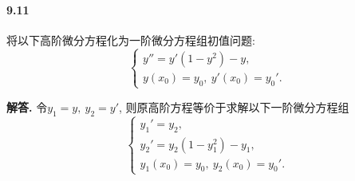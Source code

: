 \documentclass[12pt, a4paper, oneside]{ctexart}
\newenvironment{solution}{\par\noindent\textbf{解答. }}{\bigskip\par}
\begin{document}
\paragraph{9.11}将以下高阶微分方程化为一阶微分方程组初值问题:
\begin{equation*}
    \begin{cases}
        y'' = y'(1-y^2)-y,\\
        y(x_0)=y_0,\ y'(x_0)=y_0'.
    \end{cases}
\end{equation*}
\begin{solution}
    令$y_1 = y,\ y_2 = y'$, 则原高阶方程等价于求解以下一阶微分方程组
    \begin{equation*}
        \begin{cases}
            y_1' = y_2,\\
            y_2' = y_2(1-y_1^2) - y_1,\\
            y_1(x_0) = y_0,\ y_2(x_0) = y_0'.
        \end{cases}
    \end{equation*}
\end{solution}
\iffalse
\centerline{
    \texttt{[image: figure.png]}
}
\fi
\iffalse
\renewcommand\arraystretch{0.8} %
\begin{table}[!htbp] %
    \centering %
    \begin{tabular}{p{1cm}<{\centering}p{1cm}<{\centering}p{3cm}<{\centering}p{5cm}<{\centering}} %
        \toprule
        $x_i$ & $f[x_1]$ & $f[x_i,x_{i+1}]$ & $f[x_i,x_{i+1},x_{i+2}]$ \\
        \midrule
        $x_0$ & $f(x_0)$ &                  &                          \\
        $x_0$ & $f(x_0)$ & $f'(x_0)$        &                          \\
        $x_0$ & $f(x_1)$ & $\frac{f(x_1)-f(x_0)}{x_1-x_0}$ & $\frac{f(x_1)-f(x_0)}{(x_1-x_0)^2}-\frac{f'(x_0)}{x_1-x_0}$\\
        \bottomrule
    \end{tabular}
\end{table}

\def\Log{\text{Log}} %
$\Log$ %
\fi
\end{document}
